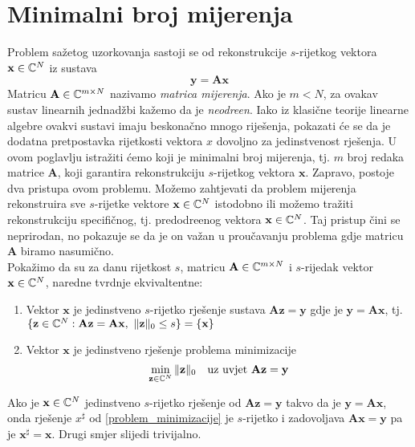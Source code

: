 \documentclass[a4paper,twoside,12pt]{memoir} %
\newcommand{\vect}[1]{\mathbf{#1}}
\newcommand{\norm}[1]{\|{#1}\|}
\begin{document}
\section[Minimalni broj mijerenja][Minimalni broj mijerenja]{Minimalni broj mijerenja}
Problem sa\v{z}etog uzorkovanja sastoji se od rekonstrukcije $s$-rijetkog vektora $\vect{x} \in \C^N$ iz sustava
$$\vect{y} = \vect{A}\vect{x}$$
Matricu $\vect{A} \in \C^{m\times N}$ nazivamo \textit{matrica mijerenja}. Ako je $m < N$, za ovakav sustav linearnih jednad\v{z}bi ka\v{z}emo da je \textit{neodre\dj en}. Iako iz klasi\v{c}ne teorije linearne algebre ovakvi sustavi imaju beskona\v{c}no mnogo rije\v{s}enja, pokazati \'ce se da je dodatna pretpostavka rijetkosti vektora $x$ dovoljno za jedinstvenost rje\v{s}enja. U ovom poglavlju istra\v{z}iti \'cemo koji je minimalni broj mijerenja, tj. $m$ broj redaka matrice $\vect{A}$, koji garantira rekonstrukciju $s$-rijetkog vektora $\vect{x}$. Zapravo, postoje dva pristupa ovom problemu. Mo\v{z}emo zahtjevati da problem mijerenja rekonstruira sve $s$-rijetke vektore $\vect{x} \in \C^N$ istodobno ili mo\v{z}emo tra\v{z}iti rekonstrukciju specifi\v{c}nog, tj. predodre\dj enog vektora $\vect{x} \in \C^N$. Taj pristup \v{c}ini se neprirodan, no pokazuje se da je on va\v{z}an u prou\v{c}avanju problema gdje matricu $\vect{A}$ biramo nasumi\v{c}no. \\ 
\indent Poka\v{z}imo da su za danu rijetkost $s$, matricu $\vect{A} \in \C^{m \times N}$ i $s$-rijedak vektor $\vect{x} \in \C^N$, naredne tvrdnje ekvivaltentne: 
\begin{enumerate}
    \item Vektor $\vect{x}$ je jedinstveno $s$-rijetko rje\v{s}enje sustava $\vect{A}\vect{z}=\vect{y}$ gdje je $\vect{y} = \vect{Ax}$, tj. $\{\vect{z} \in \C^N : \vect{A}\vect{z}= \vect{A}\vect{x},\ \norm{\vect{z}}_0 \leq s\} = \{\vect{x}\}$
    \item Vektor $\vect{x}$ je jedinstveno rje\v{s}enje problema minimizacije
        \begin{equation}
            \min\limits_{\vect{z} \in \C^N} \norm{\vect{z}}_0\quad \text{uz uvjet}\ \vect{Az} = \vect y \label{problem_minimizacije} 
        \end{equation}
\end{enumerate}
Ako je $\vect{x} \in \C^N$ jedinstveno $s$-rijetko rje\v{s}enje od $\vect{Az} = \vect y$ takvo da je $\vect y = \vect{Ax}$, onda rje\v{s}enje $x^{\sharp}$ od \eqref{problem_minimizacije} je $s$-rijetko i zadovoljava $\vect{Ax} = \vect y$ pa je $\vect x^\sharp = \vect x$. Drugi smjer slijedi trivijalno.
\end{document}
